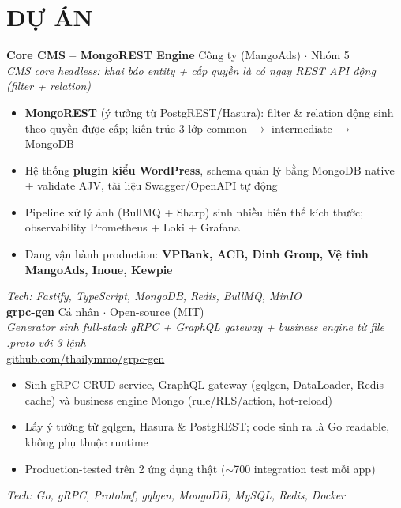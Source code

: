 \documentclass[11pt,a4paper]{article}
\begin{document}
\section{DỰ ÁN}

\textbf{Core CMS -- MongoREST Engine} \hfill Công ty (MangoAds) $\cdot$ Nhóm 5 \\
\textit{CMS core headless: khai báo entity + cấp quyền là có ngay REST API động (filter + relation)} \\
\begin{itemize}[leftmargin=*, nosep]
    \item \textbf{MongoREST} (ý tưởng từ PostgREST/Hasura): filter \& relation động sinh theo quyền được cấp; kiến trúc 3 lớp common $\rightarrow$ intermediate $\rightarrow$ MongoDB
    \item Hệ thống \textbf{plugin kiểu WordPress}, schema quản lý bằng MongoDB native + validate AJV, tài liệu Swagger/OpenAPI tự động
    \item Pipeline xử lý ảnh (BullMQ + Sharp) sinh nhiều biến thể kích thước; observability Prometheus + Loki + Grafana
    \item Đang vận hành production: \textbf{VPBank, ACB, Dinh Group, Vệ tinh MangoAds, Inoue, Kewpie}
\end{itemize}
\textit{Tech: Fastify, TypeScript, MongoDB, Redis, BullMQ, MinIO} \\[8pt]

\textbf{grpc-gen} \hfill Cá nhân $\cdot$ Open-source (MIT) \\
\textit{Generator sinh full-stack gRPC + GraphQL gateway + business engine từ file .proto với 3 lệnh} \\
\href{https://github.com/thailymmo/grpc-gen}{github.com/thailymmo/grpc-gen} \\
\begin{itemize}[leftmargin=*, nosep]
    \item Sinh gRPC CRUD service, GraphQL gateway (gqlgen, DataLoader, Redis cache) và business engine Mongo (rule/RLS/action, hot-reload)
    \item Lấy ý tưởng từ gqlgen, Hasura \& PostgREST; code sinh ra là Go readable, không phụ thuộc runtime
    \item Production-tested trên 2 ứng dụng thật ($\sim$700 integration test mỗi app)
\end{itemize}
\textit{Tech: Go, gRPC, Protobuf, gqlgen, MongoDB, MySQL, Redis, Docker} \\[8pt]
\end{document}

